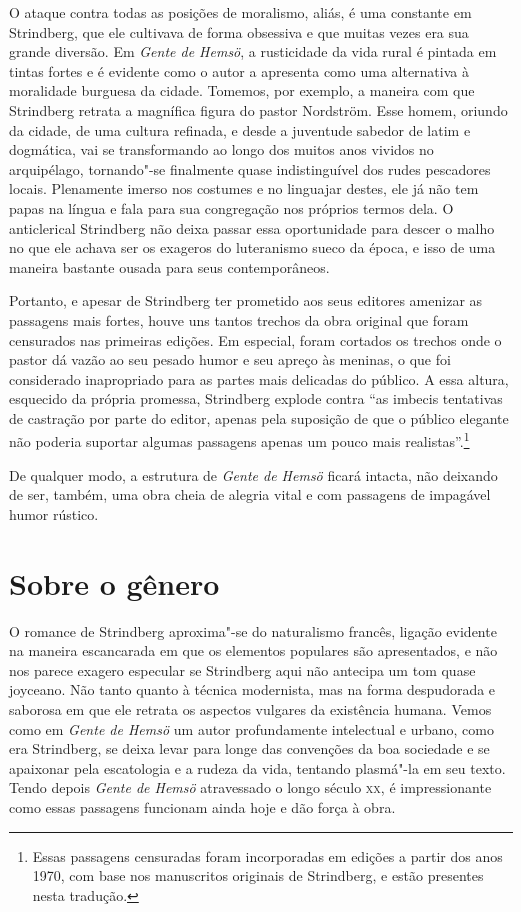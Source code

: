 O ataque contra todas as posições de moralismo, aliás, é uma constante
em Strindberg, que ele cultivava de forma obsessiva e que
muitas vezes era sua grande diversão. Em \textit{Gente de Hemsö}, a
rusticidade da vida rural é pintada em tintas fortes e é evidente como
o autor a apresenta como uma alternativa à moralidade burguesa da
cidade. Tomemos, por exemplo, a maneira com que Strindberg retrata a
magnífica figura do pastor Nordström. Esse homem, oriundo da cidade, 
de uma cultura refinada, e desde a juventude sabedor de latim e
dogmática, vai se transformando ao longo dos muitos anos vividos
no arquipélago, tornando"-se finalmente quase indistinguível dos rudes
pescadores locais. Plenamente imerso nos costumes e no
linguajar destes, ele já não tem papas na língua e fala para sua
congregação nos próprios termos dela. O anticlerical Strindberg não deixa
passar essa oportunidade para descer o malho no que ele achava ser os
exageros do luteranismo sueco da época, e isso de uma maneira bastante
ousada para seus contemporâneos. 

Portanto, e apesar de Strindberg ter prometido aos seus editores 
amenizar as passagens mais fortes, houve uns tantos trechos da obra
original que foram censurados nas primeiras edições. Em especial, foram
cortados os trechos onde o pastor dá vazão ao seu pesado humor e seu 
apreço às meninas, o que foi considerado inapropriado para as partes 
mais delicadas do público. A essa altura, esquecido da própria promessa, 
Strindberg explode contra ``as imbecis tentativas de castração por parte 
do editor, apenas pela suposição de que o público elegante não poderia
suportar algumas passagens apenas um pouco mais realistas''.\footnote{ Essas passagens
censuradas foram incorporadas em edições a partir dos anos 1970, com base 
nos manuscritos originais de Strindberg, e estão presentes nesta tradução.}

De qualquer modo, a estrutura de \textit{Gente de Hemsö} ficará intacta, não
deixando de ser, também, uma obra cheia de alegria vital e com
passagens de impagável humor rústico. 

\section{Sobre o gênero}

O romance de Strindberg aproxima"-se do naturalismo
francês, ligação evidente na maneira escancarada em que os elementos
populares são apresentados, e não nos parece exagero
especular se Strindberg aqui não antecipa um tom quase joyceano. 
Não tanto quanto à técnica modernista, mas na forma despudorada e saborosa em
que ele retrata os aspectos vulgares da existência humana.
Vemos como em \textit{Gente de Hemsö} um autor profundamente intelectual 
e urbano, como era Strindberg, se deixa levar para longe das convenções 
da boa sociedade e se apaixonar pela escatologia e a rudeza da vida,
tentando plasmá"-la em seu texto. Tendo depois \textit{Gente de Hemsö} 
atravessado o longo século \textsc{xx}, é impressionante como essas
passagens funcionam ainda hoje e dão força à obra. 

